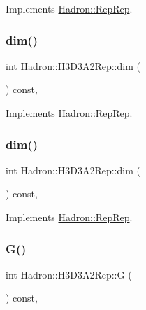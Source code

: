 Implements \mbox{\hyperlink{structHadron_1_1RepRep_a92c8802e5ed7afd7da43ccfd5b7cd92b}{Hadron\+::\+Rep\+Rep}}.

\mbox{\label{structHadron_1_1H3D3A2Rep_ab7b4c300c476b1e9771638ef5eee9e7e}} 
\subsubsection{\texorpdfstring{dim()}{dim()}\hspace{0.1cm}{\footnotesize\ttfamily [2/3]}}
{\footnotesize\ttfamily int Hadron\+::\+H3\+D3\+A2\+Rep\+::dim (\begin{DoxyParamCaption}{ }\end{DoxyParamCaption}) const\hspace{0.3cm}{\ttfamily [inline]}, {\ttfamily [virtual]}}



Implements \mbox{\hyperlink{structHadron_1_1RepRep_a92c8802e5ed7afd7da43ccfd5b7cd92b}{Hadron\+::\+Rep\+Rep}}.

\mbox{\label{structHadron_1_1H3D3A2Rep_ab7b4c300c476b1e9771638ef5eee9e7e}} 
\subsubsection{\texorpdfstring{dim()}{dim()}\hspace{0.1cm}{\footnotesize\ttfamily [3/3]}}
{\footnotesize\ttfamily int Hadron\+::\+H3\+D3\+A2\+Rep\+::dim (\begin{DoxyParamCaption}{ }\end{DoxyParamCaption}) const\hspace{0.3cm}{\ttfamily [inline]}, {\ttfamily [virtual]}}



Implements \mbox{\hyperlink{structHadron_1_1RepRep_a92c8802e5ed7afd7da43ccfd5b7cd92b}{Hadron\+::\+Rep\+Rep}}.

\mbox{\label{structHadron_1_1H3D3A2Rep_aae22d0d5ee1cbaa01ff3677e011105bc}} 
\subsubsection{\texorpdfstring{G()}{G()}\hspace{0.1cm}{\footnotesize\ttfamily [1/2]}}
{\footnotesize\ttfamily int Hadron\+::\+H3\+D3\+A2\+Rep\+::G (\begin{DoxyParamCaption}{ }\end{DoxyParamCaption}) const\hspace{0.3cm}{\ttfamily [inline]}, {\ttfamily [virtual]}}

